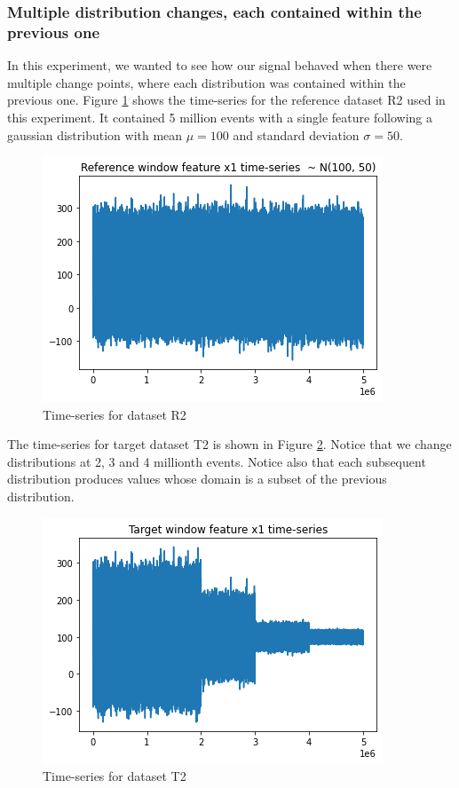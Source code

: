 \subsubsection{Multiple distribution changes, each contained within the previous one}
In this experiment, we wanted to see how our signal behaved when there were multiple change points, where each distribution was contained within the previous one. Figure \ref{fig:timeseries-r2} shows the time-series for the reference dataset R2 used in this experiment. It contained 5 million events with a single feature following a gaussian distribution with mean $\mu=100$ and standard deviation $\sigma=50$.
\begin{figure}[!htb]
    \begin{center}
      \includegraphics[scale=0.6]{figures/timeseries-r2.png}
      \caption[]{Time-series for dataset R2}
      \label{fig:timeseries-r2}
    \end{center}
\end{figure}
The time-series for target dataset T2 is shown in Figure \ref{fig:timeseries-t2}. Notice that we change distributions at 2, 3 and 4 millionth events. Notice also that each subsequent distribution produces values whose domain is a subset of the previous distribution. 
\begin{figure}[!htb]
    \begin{center}
      \includegraphics[scale=0.6]{figures/timeseries-t2.png}
      \caption[]{Time-series for dataset T2}
      \label{fig:timeseries-t2}
    \end{center}
\end{figure}

